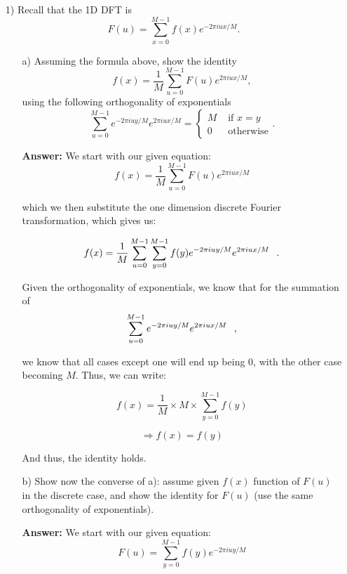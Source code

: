 \documentclass{article}
\begin{document}
\begin{enumerate}
\item[1)] Recall that the 1D DFT is 
$$F(u)=\sum_{x=0}^{M-1}f(x)e^{-2\pi iux/M}.$$

\begin{enumerate}

\item[a)]Assuming the formula above, show the identity 
$$f(x)=\frac{1}{M}\sum_{u=0}^{M-1}F(u)e^{2\pi i u x/M},$$
using the following orthogonality of exponentials 
$$\sum_{u=0}^{M-1}e^{-2\pi iuy/M}e^{2\pi iux/M}=
\left\{
\begin{array}{ll}
M&\mbox{ if }x=y\\
0 &\mbox{ otherwise}
\end{array}.
\right.
$$

\vspace{0.1in}
\textbf{Answer:} We start with our given equation:
$$f(x)=\frac{1}{M}\sum_{u=0}^{M-1}F(u)e^{2\pi i u x/M}$$

which we then substitute the one dimension discrete Fourier transformation, which gives us:

\begin{equation}
f(x) = \frac{1}{M}\sum_{u=0}^{M-1} \sum_{y=0}^{M-1}f(y)e^{-2\pi iuy/M}e^{2\pi i u x/M} \hspace{0.1in} .
\end{equation}

Given the orthogonality of exponentials, we know that for the summation of
$$ \sum_{u=0}^{M-1}e^{-2\pi iuy/M}e^{2\pi iux/M} \hspace{0.1in} ,$$ 

we know that all cases except one will end up being $0$, with the other case becoming $M$.  Thus, we can write:

\begin{equation}
f(x) = \frac{1}{M} \times M \times \sum_{y=0}^{M-1}f(y)
\end{equation}

\begin{equation}
\Rightarrow f(x) = f(y)
\end{equation}

And thus, the identity holds.

\item[b)] Show now the converse of a): assume given $f(x)$ function of 
$F(u)$ in the discrete case, and show the identity for $F(u)$ (use the same orthogonality of exponentials). 

\vspace{0.01in}
\textbf{Answer:} We start with our given equation:
$$F(u)=\sum_{y=0}^{M-1}f(y)e^{-2\pi iuy/M}$$


\end{enumerate}
\end{enumerate}
\end{document}
